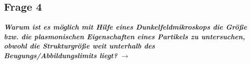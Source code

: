 \subsection{\label{subsec:FZV4}Frage 4}
\textbf{\textit{Warum ist es möglich mit Hilfe eines Dunkelfeldmikroskops die Größe bzw. die
plasmonischen Eigenschaften eines Partikels zu untersuchen, obwohl die Strukturgröße 
weit unterhalb des Beugungs/Abbildungslimits liegt?}}
$\rightarrow$